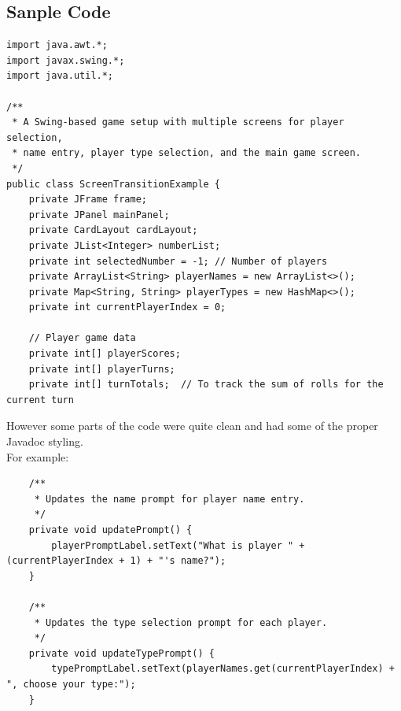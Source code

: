\documentclass[a4paper,11pt]{article}
\begin{document}
\subsection*{Sanple Code}
\begin{lstlisting}
import java.awt.*;
import javax.swing.*;
import java.util.*;

/**
 * A Swing-based game setup with multiple screens for player selection,
 * name entry, player type selection, and the main game screen.
 */
public class ScreenTransitionExample {
    private JFrame frame;
    private JPanel mainPanel;
    private CardLayout cardLayout;
    private JList<Integer> numberList;
    private int selectedNumber = -1; // Number of players
    private ArrayList<String> playerNames = new ArrayList<>();
    private Map<String, String> playerTypes = new HashMap<>();
    private int currentPlayerIndex = 0;

    // Player game data
    private int[] playerScores;
    private int[] playerTurns;
    private int[] turnTotals;  // To track the sum of rolls for the current turn

\end{lstlisting}
However some parts of the code were quite clean and had some of the proper Javadoc styling. \\
For example: 
\begin{lstlisting}
    /**
     * Updates the name prompt for player name entry.
     */
    private void updatePrompt() {
        playerPromptLabel.setText("What is player " + (currentPlayerIndex + 1) + "'s name?");
    }

    /**
     * Updates the type selection prompt for each player.
     */
    private void updateTypePrompt() {
        typePromptLabel.setText(playerNames.get(currentPlayerIndex) + ", choose your type:");
    }
\end{lstlisting}
\end{document}
